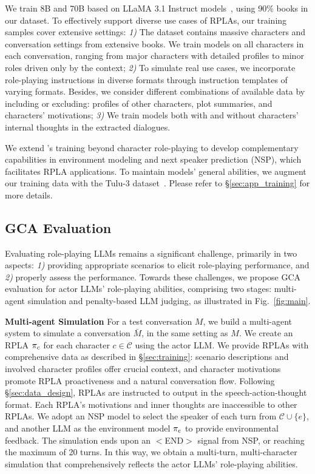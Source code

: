 We train \method 8B and \method 70B based on LLaMA 3.1 Instruct models~\citep{dubey2024llama}, using 90\% books in our dataset. 
To effectively support diverse use cases of RPLAs, 
our training samples cover extensive settings: 
\textit{1)} The \method dataset contains massive characters and conversation settings from extensive books.  
We train models on all characters in each conversation, ranging from major characters with detailed profiles to minor roles driven only by the context;  
\textit{2)} To simulate real use cases, we incorporate role-playing instructions in diverse formats through instruction templates of varying formats. 
Besides, we consider different combinations of available data by including or excluding: profiles of other characters, plot summaries, and characters' motivations;   
\textit{3)} We train models both with and without characters' internal thoughts in the extracted dialogues. 

We extend \method's training beyond character role-playing to develop complementary capabilities in environment modeling and next speaker prediction (NSP), which facilitates RPLA applications.  
To maintain models' general abilities, we augment our training data with the Tulu-3 dataset~\citep{lambert2024tulu}. 
Please refer to \S\ref{sec:app_training} for more details.  




\subsection{GCA Evaluation}
\label{sec:eval}


Evaluating role-playing LLMs remains a significant challenge, primarily in two aspects: 
\textit{1)} providing appropriate scenarios to elicit role-playing performance, and 
\textit{2)} properly assess the performance. 
Towards these challenges, we propose GCA evaluation for actor LLMs' role-playing abilities, comprising two stages: 
multi-agent simulation and penalty-based LLM judging, as illustrated in Fig.~\ref{fig:main}.

\textbf{Multi-agent Simulation} \quad 
For a test conversation $M$, 
we build a multi-agent system to simulate a conversation $\bar{M}$, in the same setting as $M$. 
We create an RPLA $\pi_c$ for each character $c \in \mathcal{C}$ using the actor LLM.
We provide RPLAs with comprehensive data as described in \S\ref{sec:training}:   
scenario descriptions and involved character profiles offer crucial context, and character motivations promote RPLA proactiveness and a natural conversation flow. 
Following \S\ref{sec:data_design}, 
RPLAs are instructed to output in the speech-action-thought format. 
Each RPLA's motivations and inner thoughts are inaccessible to other RPLAs. 
We adopt an NSP model to select the speaker of each turn from $\mathcal{C}\cup\{e\}$, and another LLM as the environment model $\pi_e$ to provide environmental feedback. 
The simulation ends upon an $<$END$>$ signal from NSP, or reaching the maximum of 20 turns. 
In this way, we obtain a multi-turn, multi-character simulation that comprehensively reflects the actor LLMs' role-playing abilities. 

